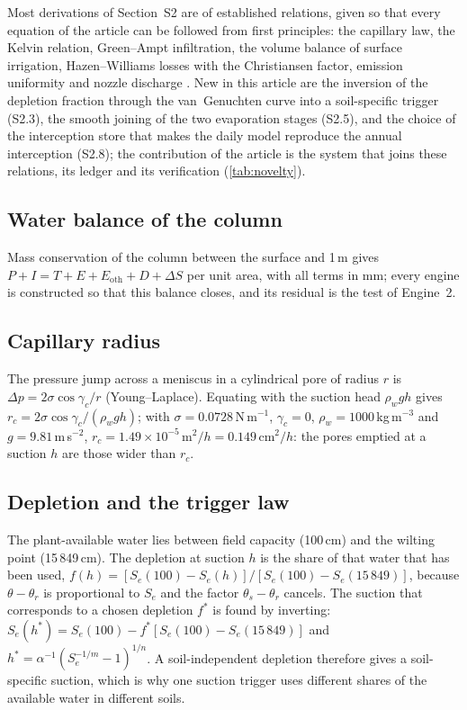 Most derivations of Section~S2 are of established relations, given so that every equation of the article can be followed from first principles: the capillary law, the Kelvin relation, Green--Ampt infiltration, the volume balance of surface irrigation, Hazen--Williams losses with the Christiansen factor, emission uniformity and nozzle discharge \citep{GreenAmpt1911,Walker1987,Christiansen1942,KellerKarmeli1974}. New in this article are the inversion of the depletion fraction through the van~Genuchten curve into a soil-specific trigger (S2.3), the smooth joining of the two evaporation stages (S2.5), and the choice of the interception store that makes the daily model reproduce the annual interception (S2.8); the contribution of the article is the system that joins these relations, its ledger and its verification (\cref{tab:novelty}).

\subsection{Water balance of the column}
Mass conservation of the column between the surface and 1\,m gives $P+I=T+E+E_{\mathrm{oth}}+D+\Delta S$ per unit area, with all terms in mm; every engine is constructed so that this balance closes, and its residual is the test of Engine~2.

\subsection{Capillary radius}
The pressure jump across a meniscus in a cylindrical pore of radius $r$ is $\Delta p=2\sigma\cos\gamma_c/r$ (Young--Laplace). Equating with the suction head $\rho_wgh$ gives $r_c=2\sigma\cos\gamma_c/(\rho_wgh)$; with $\sigma=0.0728$\,N\,m$^{-1}$, $\gamma_c=0$, $\rho_w=1000$\,kg\,m$^{-3}$ and $g=9.81$\,m\,s$^{-2}$, $r_c=1.49\times10^{-5}\,\mathrm{m^2}/h=0.149\,\mathrm{cm^2}/h$: the pores emptied at a suction $h$ are those wider than $r_c$.

\subsection{Depletion and the trigger law}
The plant-available water lies between field capacity (100\,cm) and the wilting point (15\,849\,cm). The depletion at suction $h$ is the share of that water that has been used, $f(h)=[S_e(100)-S_e(h)]/[S_e(100)-S_e(15\,849)]$, because $\theta-\theta_r$ is proportional to $S_e$ and the factor $\theta_s-\theta_r$ cancels. The suction that corresponds to a chosen depletion $f^\ast$ is found by inverting: $S_e(h^\ast)=S_e(100)-f^\ast[S_e(100)-S_e(15\,849)]$ and $h^\ast=\alpha^{-1}(S_e^{-1/m}-1)^{1/n}$. A soil-independent depletion therefore gives a soil-specific suction, which is why one suction trigger uses different shares of the available water in different soils.

